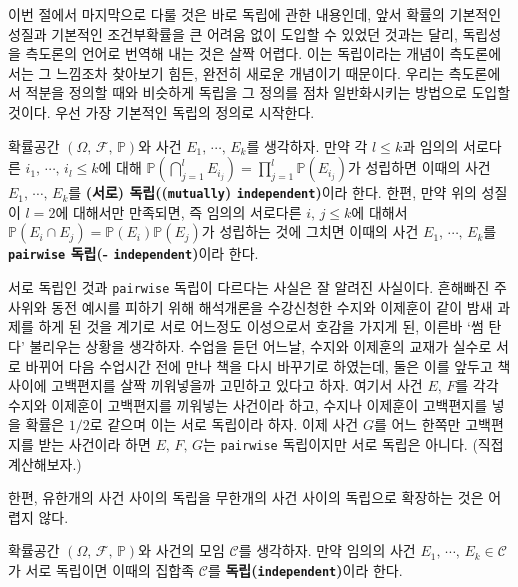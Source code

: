이번 절에서 마지막으로 다룰 것은 바로 독립에 관한 내용인데, 앞서 확률의 기본적인 성질과 기본적인 조건부확률을 큰 어려움 없이 도입할 수 있었던 것과는 달리, 독립성을 측도론의 언어로 번역해 내는 것은 살짝 어렵다. 이는 독립이라는 개념이 측도론에서는 그 느낌조차 찾아보기 힘든, 완전히 새로운 개념이기 때문이다. 우리는 측도론에서 적분을 정의할 때와 비슷하게 독립을 그 정의를 점차 일반화시키는 방법으로 도입할 것이다. 우선 가장 기본적인 독립의 정의로 시작한다.

\begin{definition}
    확률공간 $(\Omega,\,\mathcal{F},\,\mathbb{P})$와 사건 $E_1,\,\cdots,\,E_k$를 생각하자. 만약 각 $l\leq k$과 임의의 서로다른 $i_1,\,\cdots,\,i_l\leq k$에 대해 $\mathbb{P}(\bigcap_{j=1}^lE_{i_j})=\prod_{j=1}^l\mathbb{P}(E_{i_j})$가 성립하면 이때의 사건 $E_1,\,\cdots,\,E_k$를 \textbf{(서로) 독립((\texttt{mutually}) \texttt{independent})}이라 한다. 한편, 만약 위의 성질이 $l=2$에 대해서만 만족되면, 즉 임의의 서로다른 $i,\,j\leq k$에 대해서 $\mathbb{P}(E_i\cap E_j)=\mathbb{P}(E_i)\mathbb{P}(E_j)$가 성립하는 것에 그치면 이때의 사건 $E_1,\,\cdots,\,E_k$를 \textbf{\texttt{pairwise} 독립(- \texttt{independent})}이라 한다.
\end{definition}

서로 독립인 것과 \texttt{pairwise} 독립이 다르다는 사실은 잘 알려진 사실이다. 흔해빠진 주사위와 동전 예시를 피하기 위해 해석개론을 수강신청한 수지와 이제훈이 같이 밤새 과제를 하게 된 것을 계기로 서로 어느정도 이성으로서 호감을 가지게 된, 이른바 `썸 탄다' 불리우는 상황을 생각하자. 수업을 듣던 어느날, 수지와 이제훈의 교재가 실수로 서로 바뀌어 다음 수업시간 전에 만나 책을 다시 바꾸기로 하였는데, 둘은 이를 앞두고 책 사이에 고백편지를 살짝 끼워넣을까 고민하고 있다고 하자. 여기서 사건 $E,\,F$를 각각 수지와 이제훈이 고백편지를 끼워넣는 사건이라 하고, 수지나 이제훈이 고백편지를 넣을 확률은 $1/2$로 같으며 이는 서로 독립이라 하자. 이제 사건 $G$를 어느 한쪽만 고백편지를 받는 사건이라 하면 $E,\,F,\,G$는 \texttt{pairwise} 독립이지만 서로 독립은 아니다. (직접 계산해보자.)

한편, 유한개의 사건 사이의 독립을 무한개의 사건 사이의 독립으로 확장하는 것은 어렵지 않다.

\begin{definition}
    확률공간 $(\Omega,\,\mathcal{F},\,\mathbb{P})$와 사건의 모임 $\mathcal{C}$를 생각하자. 만약 임의의 사건 $E_1,\,\cdots,\,E_k\in\mathcal{C}$가 서로 독립이면 이때의 집합족 $\mathcal{C}$를 \textbf{독립(\texttt{independent})}이라 한다.
\end{definition}

